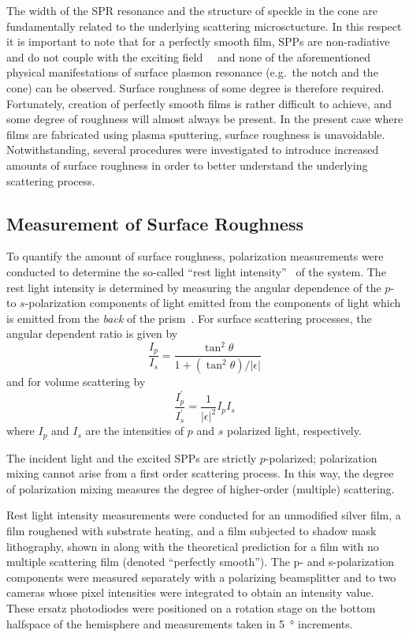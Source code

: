 The width of the SPR resonance and the structure of speckle in the cone are
fundamentally related to the underlying scattering microsctucture.  In this
respect it is important to note that for a perfectly smooth film, SPPs are
non-radiative and do not couple with the exciting
field~\cite{johansson1990theory}~\cite{otto1968excitation} and none of the
aforementioned physical manifestations of surface plasmon resonance (e.g.\  the
notch and the cone) can be observed.  Surface roughness of some degree is
therefore required.  Fortunately, creation of perfectly smooth films is rather
difficult to achieve, and some degree of roughness will almost always be
present.  In the present case where films are fabricated using plasma
sputtering, surface roughness is unavoidable.  Notwithstanding, several
procedures were investigated to introduce increased amounts of surface
roughness in order to better understand the underlying scattering process.

\subsection{Measurement of Surface Roughness}
To quantify the amount of surface roughness, polarization measurements were
conducted to determine the so-called ``rest light
intensity''~\cite{horstmann1977multiple} of the system.  The rest light
intensity is determined by measuring the angular dependence of the $p$- to
$s$-polarization components of light emitted from the components of light
which is emitted from the \textit{back} of the
prism~\cite{kretschmann1972decay}.  For surface scattering processes, the
angular dependent ratio is given by~\cite{kretschmann1972thesis}
\begin{equation}
\frac{I_p}{I_s} = \frac{\tan^2\theta}{1+(\tan^2\theta)/|\epsilon|}
\label{eqn:ipssurface}
\end{equation}
and for volume scattering by
\begin{equation}
\frac{I^\prime_p}{I^\prime_s} = \frac{1}{|\epsilon|^2} I_p I_s
\label{eqn:ipsvolume}
\end{equation}
where $I_p$ and $I_s$ are the intensities of $p$ and $s$ polarized light,
respectively.

The incident light and the excited SPPs are strictly $p$-polarized;
polarization mixing cannot arise from a first order scattering process.
In this way, the degree of polarization mixing measures the degree of
higher-order (multiple) scattering.

Rest light intensity measurements were conducted for an unmodified silver
film, a film roughened with substrate heating, and a film subjected to
shadow mask lithography, shown in  along with the
theoretical prediction for a film with no multiple scattering film (denoted
``perfectly smooth'').  The p- and s-polarization components were measured
separately with a polarizing beamsplitter and to two cameras whose pixel
intensities were integrated to obtain an intensity value.  These ersatz
photodiodes were positioned on a rotation stage on the bottom halfspace of
the hemisphere and measurements taken in \SI{5}{\degree} increments.


